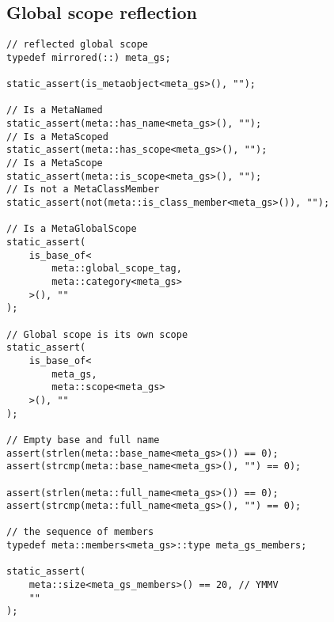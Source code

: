 
\subsection{Global scope reflection}

\begin{verbatim}
// reflected global scope
typedef mirrored(::) meta_gs;

static_assert(is_metaobject<meta_gs>(), "");

// Is a MetaNamed
static_assert(meta::has_name<meta_gs>(), "");
// Is a MetaScoped
static_assert(meta::has_scope<meta_gs>(), "");
// Is a MetaScope
static_assert(meta::is_scope<meta_gs>(), "");
// Is not a MetaClassMember
static_assert(not(meta::is_class_member<meta_gs>()), "");

// Is a MetaGlobalScope
static_assert(
	is_base_of<
		meta::global_scope_tag,
		meta::category<meta_gs>
	>(), ""
);

// Global scope is its own scope
static_assert(
	is_base_of<
		meta_gs,
		meta::scope<meta_gs>
	>(), ""
);

// Empty base and full name
assert(strlen(meta::base_name<meta_gs>()) == 0);
assert(strcmp(meta::base_name<meta_gs>(), "") == 0);

assert(strlen(meta::full_name<meta_gs>()) == 0);
assert(strcmp(meta::full_name<meta_gs>(), "") == 0);

// the sequence of members
typedef meta::members<meta_gs>::type meta_gs_members;

static_assert(
	meta::size<meta_gs_members>() == 20, // YMMV
	""
);

\end{verbatim}

